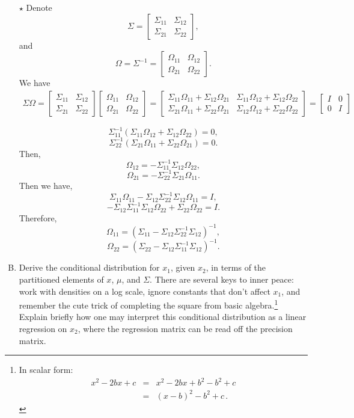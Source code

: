 \documentclass[11pt]{article}
\newcommand{\jie}{$\star$ }
\begin{document}
\begin{enumerate}[(A)]
\jie 
Denote
$$\Sigma = \begin{bmatrix}
\Sigma_{11} & \Sigma_{12} \\
\Sigma_{21} & \Sigma_{22}
\end{bmatrix},$$
and
$$\Omega = \Sigma^{-1} = \begin{bmatrix}
\Omega_{11} & \Omega_{12} \\
\Omega_{21} & \Omega_{22}
\end{bmatrix}.$$
We have
\begin{align*}
    \Sigma \Omega = \begin{bmatrix}
\Sigma_{11} & \Sigma_{12} \\
\Sigma_{21} & \Sigma_{22}
\end{bmatrix}
\begin{bmatrix}
\Omega_{11} & \Omega_{12} \\
\Omega_{21} & \Omega_{22}
\end{bmatrix}
=
\begin{bmatrix}
\Sigma_{11} \Omega_{11} + \Sigma_{12} \Omega_{21} & \Sigma_{11} \Omega_{12} + \Sigma_{12} \Omega_{22} \\
\Sigma_{21} \Omega_{11} + \Sigma_{22} \Omega_{21} & \Sigma_{12} \Omega_{12} + \Sigma_{22} \Omega_{22}
\end{bmatrix}
=
\begin{bmatrix}
I & 0 \\
0 & I
\end{bmatrix}
\end{align*}

$$\Sigma_{11}^{-1} (\Sigma_{11} \Omega_{12} + \Sigma_{12}\Omega_{22}) = 0,$$
$$\Sigma_{22}^{-1} (\Sigma_{21}\Omega_{11} + \Sigma_{22}\Omega_{21}) = 0.$$
Then,
$$\Omega_{12} = - \Sigma_{11}^{-1} \Sigma_{12} \Omega_{22},$$
$$\Omega_{21} = - \Sigma_{22}^{-1} \Sigma_{21} \Omega_{11}.$$
Then we have,
$$\Sigma_{11} \Omega_{11} - \Sigma_{12} \Sigma_{22}^{-1} \Sigma_{12} \Omega_{11} = I,$$
$$-\Sigma_{12} \Sigma_{11}^{-1} \Sigma_{12} \Omega_{22} + \Sigma_{22} \Omega_{22} = I.$$
Therefore,
$$\Omega_{11} = (\Sigma_{11} - \Sigma_{12}\Sigma_{22}^{-1}\Sigma_{12})^{-1},$$
$$\Omega_{22} = (\Sigma_{22} - \Sigma_{12}\Sigma_{11}^{-1} \Sigma_{12})^{-1}.$$

\bigskip 

\item Derive the conditional distribution for $x_1$, given $x_2$, in terms of the partitioned elements of $x$, $\mu$, and $\Sigma$.  There are several keys to inner peace: work with densities on a log scale, ignore constants that don't affect $x_1$, and remember the cute trick of completing the square from basic algebra.\footnote{In scalar form:
\begin{eqnarray*}
x^2 - 2bx + c &=& x^2 - 2bx + b^2 - b^2 + c \\
&=& (x-b)^2 - b^2 + c \, .
\end{eqnarray*}
}
Explain briefly how one may interpret this conditional distribution as a linear regression on $x_2$, where the regression matrix can be read off the precision matrix.


\end{enumerate}
\end{document}
